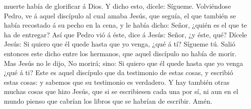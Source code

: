 muerte había de glorificar á Dios. Y dicho esto, dícele: Sígueme.
 Volviéndose Pedro, ve á aquel discípulo al cual amaba
Jesús, que seguía, el que también se había recostado á su pecho en la
cena, y le había dicho: Señor, ¿quién es el que te ha de entregar?
 Así que Pedro vió á éste, dice á Jesús: Señor, ¿y éste,
qué?  Dícele Jesús: Si quiero que él quede hasta que yo
venga, ¿qué á tí? Sígueme tú.  Salió entonces este dicho
entre los hermanos, que aquel discípulo no había de morir. Mas Jesús no
le dijo, No morirá; sino: Si quiero que él quede hasta que yo venga ¿qué
á ti?  Este es aquel discípulo que da testimonio de estas
cosas, y escribió estas cosas: y sabemos que su testimonio es verdadero.
 Y hay también otras muchas cosas que hizo Jesús, que si
se escribiesen cada una por sí, ni aun en el mundo pienso que cabrían
los libros que se habrían de escribir. Amén.
